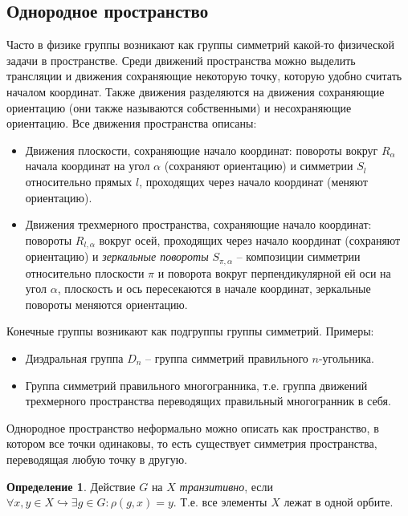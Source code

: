 \documentclass[12pt]{article}
\theoremstyle{definition}
\newtheorem{defin}[theorem]{Определение}
\begin{document}
\subsection{Однородное пространство}
Часто в физике группы возникают как группы симметрий какой-то физической задачи в пространстве. Среди движений пространства можно выделить трансляции и движения сохраняющие некоторую точку, которую удобно считать началом координат. Также движения разделяются на движения сохраняющие ориентацию (они также называются собственными) и несохраняющие ориентацию. Все движения пространства описаны:
\begin{itemize}
    \item Движения плоскости, сохраняющие начало координат: повороты вокруг $R_\alpha$ начала координат на угол $\alpha$ (сохраняют ориентацию) и симметрии $S_l$ относительно прямых $l$, проходящих через начало координат (меняют ориентацию).
    \item Движения трехмерного пространства, сохраняющие начало координат: повороты $R_{l,\alpha}$ вокруг осей, проходящих через начало координат (сохраняют ориентацию) и \textit{зеркальные повороты} $S_{\pi,\alpha}$ -- композиции симметрии относительно плоскости $\pi$ и поворота вокруг перпендикулярной ей оси на угол $\alpha$, плоскость и ось пересекаются в начале координат, зеркальные повороты меняются ориентацию.
\end{itemize}
Конечные группы возникают как подгруппы группы симметрий. Примеры:
\begin{itemize}
    \item Диэдральная группа $D_n$ -- группа симметрий правильного $n$-угольника.
    \item Группа симметрий правильного многогранника, т.е. группа движений трехмерного пространства переводящих правильный многогранник в себя.
\end{itemize}
Однородное пространство неформально можно описать как пространство, в котором все точки одинаковы, то есть существует симметрия пространства, переводящая любую точку в другую.
\begin{defin}
Действие $G$ на $X$ \textit{транзитивно}, если $\forall x,y\in X\hookrightarrow\exists g\in G: \rho(g,x)=y$. Т.е. все элементы $X$ лежат в одной орбите.
\end{defin}
\end{document}
